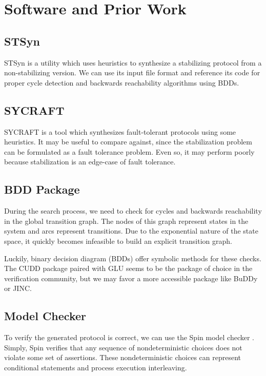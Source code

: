 \section{Software and Prior Work}

\subsection{STSyn}

STSyn \cite{taasFarahat12} is a utility which uses heuristics to synthesize a stabilizing protocol from a non-stabilizing version.
We can use its input file format and reference its code for proper cycle detection and backwards reachability algorithms using BDDs.

\subsection{SYCRAFT}

SYCRAFT \cite{sycraft2008} is a tool which synthesizes fault-tolerant protocols using some heuristics.
It may be useful to compare against, since the stabilization problem can be formulated as a fault tolerance problem.
Even so, it may perform poorly because stabilization is an edge-case of fault tolerance.

\subsection{BDD Package}

During the search process, we need to check for cycles and backwards reachability in the global transition graph.
The nodes of this graph represent states in the system and arcs represent transitions.
Due to the exponential nature of the state space, it quickly becomes infeasible to build an explicit transition graph.

Luckily, binary decision diagram (BDDs) offer symbolic methods for these checks.
The CUDD package paired with GLU seems to be the package of choice in the verification community, but we may favor a more accessible package like BuDDy or JINC.

\subsection{Model Checker}

To verify the generated protocol is correct, we can use the Spin model checker \cite{spin97}.
Simply, Spin verifies that any sequence of nondeterministic choices does not violate some set of assertions.
These nondeterministic choices can represent conditional statements and process execution interleaving.

